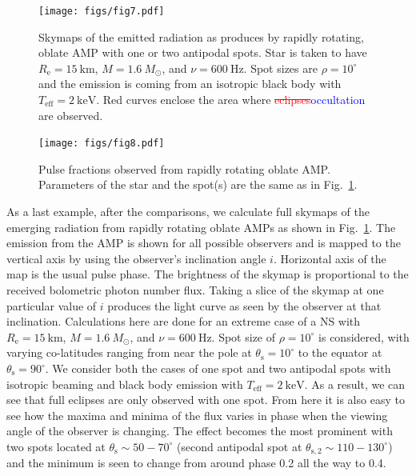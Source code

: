 \documentclass{aa}
\newcommand{\refe}[1]{\textcolor{blue}{{#1}}}
\newcommand{\refedel}[1]{\textcolor{red}{\sout{#1}}}
\newcommand{\Msun}{\ensuremath{M_{\odot}}}
\begin{document}
\begin{figure}
\texttt{[image: figs/fig7.pdf]}
\caption{\label{fig:skymap}
    Skymaps of the emitted radiation as produces by rapidly rotating, oblate AMP with one or two antipodal spots.
    Star is taken to have $R_{\mathrm{e}} = 15~\mathrm{km}$, $M=1.6~\Msun$, and $\nu = 600~\mathrm{Hz}$.
    Spot sizes are $\rho = 10^{\circ}$ and the emission is coming from an isotropic black body with $T_{\mathrm{eff}} = 2~\mathrm{keV}$.
    Red curves enclose the area where \refedel{eclipses}\refe{occultation} are observed.
  }
\end{figure}

\begin{figure}
\texttt{[image: figs/fig8.pdf]}
\caption{\label{fig:pulsefracs}
    Pulse fractions observed from rapidly rotating oblate AMP.
    Parameters of the star and the spot(s) are the same as in Fig.~\ref{fig:skymap}.
  }
\end{figure}


As a last example, after the comparisons, we calculate full skymaps of the emerging radiation from rapidly rotating oblate AMPs as shown in Fig.~\ref{fig:skymap}.
The emission from the AMP is shown for all possible observers and is mapped to the vertical axis by using the observer's inclination angle $i$.
Horizontal axis of the map is the usual pulse phase.
The brightness of the skymap is proportional to the received bolometric photon number flux.
Taking a slice of the skymap at one particular value of $i$ produces the light curve as seen by the observer at that inclination.
Calculations here are done for an extreme case of a NS with $R_{\mathrm{e}} = 15~\mathrm{km}$, $M=1.6~\Msun$, and $\nu = 600~\mathrm{Hz}$.
Spot size of $\rho = 10^{\circ}$ is considered, with varying co-latitudes ranging from near the pole at $\theta_{\mathrm{s}} = 10^{\circ}$ to the equator at $\theta_{\mathrm{s}} = 90^{\circ}$.
We consider both the cases of one spot and two antipodal spots with isotropic beaming and black body emission with $T_{\mathrm{eff}} = 2~\mathrm{keV}$.
As a result, we can see that full eclipses are only observed with one spot.
From here it is also easy to see how the maxima and minima of the flux varies in phase when the viewing angle of the observer is changing.
The effect becomes the most prominent with two spots located at $\theta_{\mathrm{s}} \sim 50-70^{\circ}$ (second antipodal spot at $\theta_{\mathrm{s,2}} \sim 110-130^{\circ}$) and the minimum is seen to change from around phase 0.2 all the way to 0.4.
\end{document}
